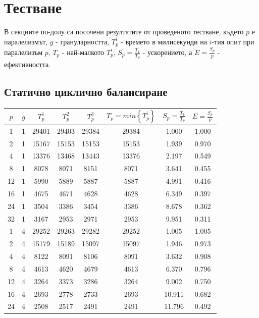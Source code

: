 \documentclass[a4paper,11pt]{article}
\begin{document}
\section{Тестване}
В секциите по-долу са посочени резултатите от проведеното тестване, където $p$ е паралелизмът, $g$ - грануларността, $T_p^i$ - времето в милисекунди на $i$-тия опит при паралелизъм $p$, $T_p$ - най-малкото $T_p^i$, $S_p = \frac{T_1}{T_p}$ - ускорението, а $E=\frac{S_p}{p}$ - ефективността. 
\subsection{Статично циклично балансиране}
\begin{table}[H]
    \centering
    \begin{tabular}{|c|c|c|c|c|c|c|c|}
    \hline
        $p$ & $g$ & $T_p^1$ & $T_p^2$ & $T_p^3$ & $T_p=min\left\{T_p^{i}\right\}$ & $S_p = \frac{T_1}{T_p}$ & $E=\frac{S_p}{p}$\\ \hline
        1 & 1 & 29401 & 29403 & 29384 & 29384 & 1.000 & 1.000 \\ \hline
        2 & 1 & 15167 & 15153 & 15153 & 15153 & 1.939 & 0.970 \\ \hline
        4 & 1 & 13376 & 13468 & 13443 & 13376 & 2.197 & 0.549 \\ \hline
        8 & 1 & 8078 & 8071 & 8151 & 8071 & 3.641 & 0.455 \\ \hline
        12 & 1 & 5990 & 5889 & 5887 & 5887 & 4.991 & 0.416 \\ \hline
        16 & 1 & 4675 & 4671 & 4628 & 4628 & 6.349 & 0.397 \\ \hline
        24 & 1 & 3504 & 3386 & 3454 & 3386 & 8.678 & 0.362 \\ \hline
        32 & 1 & 3167 & 2953 & 2971 & 2953 & 9.951 & 0.311 \\ \hline
        1 & 4 & 29252 & 29263 & 29282 & 29252 & 1.005 & 1.005 \\ \hline
        2 & 4 & 15179 & 15189 & 15097 & 15097 & 1.946 & 0.973 \\ \hline
        4 & 4 & 8122 & 8091 & 8106 & 8091 & 3.632 & 0.908 \\ \hline
        8 & 4 & 4613 & 4620 & 4679 & 4613 & 6.370 & 0.796 \\ \hline
        12 & 4 & 3264 & 3373 & 3286 & 3264 & 9.002 & 0.750 \\ \hline
        16 & 4 & 2693 & 2778 & 2733 & 2693 & 10.911 & 0.682 \\ \hline
        24 & 4 & 2508 & 2517 & 2491 & 2491 & 11.796 & 0.492 \\ \hline

\end{tabular}
\end{table}
\end{document}
